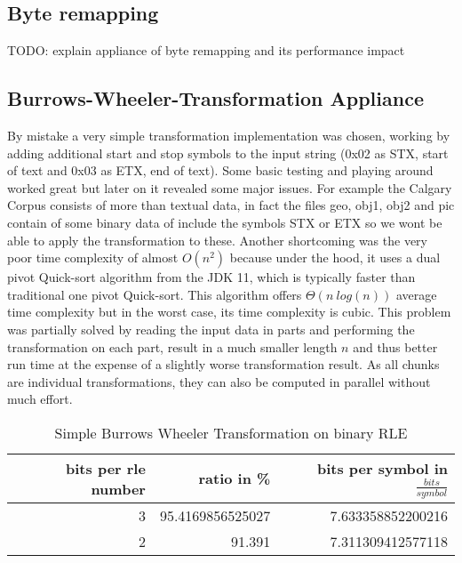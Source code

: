 \subsection{Byte remapping}
\par{
TODO: explain appliance of byte remapping and its performance impact
}

\subsection{Burrows-Wheeler-Transformation Appliance}
\par{
By mistake a very simple transformation implementation was chosen, working by adding additional start and stop symbols to the input string (0x02 as STX, start of text and 0x03 as ETX, end of text). Some basic testing and playing around worked great but later on it revealed some major issues. For example the Calgary Corpus consists of more than textual data, in fact the files geo, obj1, obj2 and pic contain of some binary data of include the symbols STX or ETX so we wont be able to apply the transformation to these. Another shortcoming was the very poor time complexity of almost $O (n^2)$ because under the hood, it uses a dual pivot Quick-sort algorithm from the JDK 11, which is typically faster than traditional one pivot Quick-sort. This algorithm offers $\Theta (n \: log(n))$ average time complexity but in the worst case, its time complexity is cubic. This problem was partially solved by reading the input data in parts and performing the transformation on each part, result in a much smaller length $n$ and thus better run time at the expense of a slightly worse transformation result. As all chunks are individual transformations, they can also be computed in parallel without much effort.

\begin{table}[h]
	\centering
	\begin{tabular}{r|r|r}	
		bits per rle number & ratio in \% & bits per symbol in $\frac{bits}{symbol}$\\
		\hline
		3 & 95.4169856525027 & 7.633358852200216\\
		2 & 91.391 & 7.311309412577118 \\
	\end{tabular}
	\caption{Simple Burrows Wheeler Transformation on binary RLE}
	\label{tab:t11 Simple Burrows Wheeler Transformation on binary RLE}
\end{table}
}
